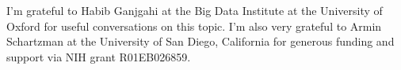 I'm grateful to Habib Ganjgahi at the Big Data Institute at the University of Oxford for useful conversations on this topic. I'm also very grateful to Armin Schartzman at the University of San Diego, California for generous funding and support via NIH grant R01EB026859.